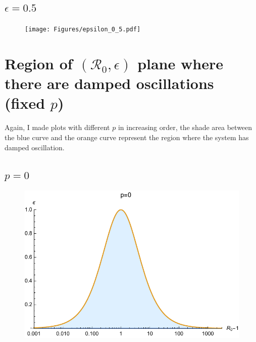 \documentclass[12pt]{article}
\newcommand{\R}{\mathcal{R}}
\begin{document}
\subsection{$\epsilon=0.5$}
\begin{figure}[H]
  \caption{}
  \centering
  \texttt{[image: Figures/epsilon\_0\_5.pdf]}
\end{figure}
\clearpage


\section{Region of $(\R_0,\epsilon)$ plane where there are damped
  oscillations (fixed $p$)}

Again, I made plots with different $p$ in increasing order, the shade area between the blue curve and the orange curve represent the region where the system has damped oscillation.
\subsection{$p=0$}
\begin{figure}[H]
  \caption{}
  \centering
  \includegraphics[width=1\textwidth]{Figures/p_0.pdf}
\end{figure}
\end{document}
